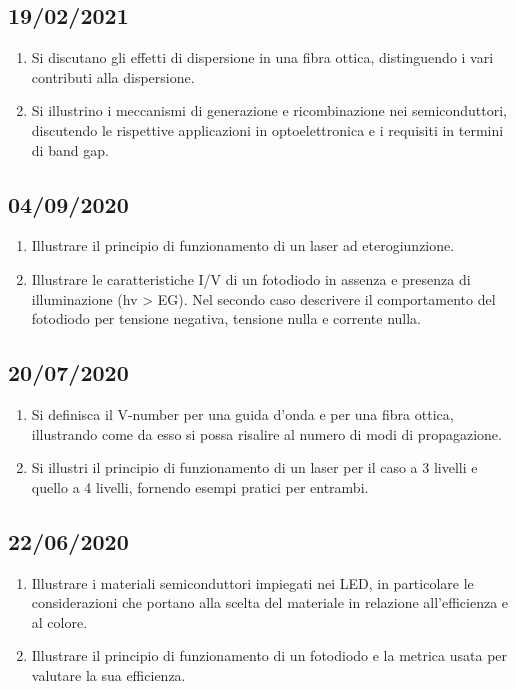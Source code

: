 \documentclass{article}
\begin{document}
\subsection{19/02/2021}
\begin{enumerate}
  \item Si discutano gli effetti di dispersione in una fibra ottica, distinguendo i vari contributi alla dispersione.
  \item Si illustrino i meccanismi di generazione e ricombinazione nei semiconduttori, discutendo le rispettive applicazioni in optoelettronica e i requisiti in termini di band gap.
\end{enumerate}

\subsection{04/09/2020}
\begin{enumerate}
  \item Illustrare il principio di funzionamento di un laser ad eterogiunzione.
  \item Illustrare le caratteristiche I/V di un fotodiodo in assenza e presenza di illuminazione (hv > EG). Nel secondo caso descrivere il comportamento del fotodiodo per tensione negativa, tensione nulla e corrente nulla.
\end{enumerate}

\subsection{20/07/2020}
\begin{enumerate}
  \item Si definisca il V-number per una guida d’onda e per una fibra ottica, illustrando come da esso si possa risalire al numero di modi di propagazione.
  \item Si illustri il principio di funzionamento di un laser per il caso a 3 livelli e quello a 4 livelli, fornendo esempi pratici per entrambi.
\end{enumerate}

\subsection{22/06/2020}
\begin{enumerate}
  \item Illustrare i materiali semiconduttori impiegati nei LED, in particolare le considerazioni che portano alla scelta del materiale in relazione all’efficienza e al colore.
  \item Illustrare il principio di funzionamento di un fotodiodo e la metrica usata per valutare la sua efficienza.
\end{enumerate}
\end{document}
